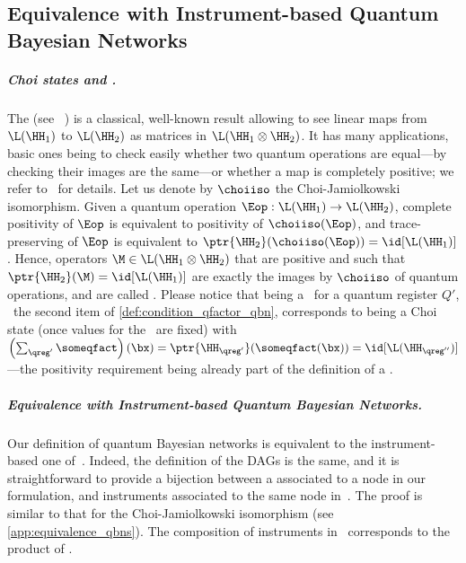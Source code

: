 \subsection{Equivalence with Instrument-based Quantum Bayesian Networks}
\label{sec:choi_iso}

\subparagraph{Choi states and \qCPTs.}

The  (see \eg~\cite{Watrous_book}) is a classical, well-known result allowing to see linear maps from $\L(\HH_1)$ to $\L(\HH_2)$ as matrices in $\L(\HH_1 \otimes \HH_2)$.
It has many applications, basic ones being to check easily whether two quantum operations are equal---by checking their images are the same---or whether a map is completely positive; we refer to~\cite{Watrous_book} for details.
Let us denote by $\choiiso$ the Choi-Jamiolkowski isomorphism.
Given a quantum operation $\Eop : \L(\HH_1) \to \L(\HH_2)$, complete positivity of $\Eop$ is equivalent to positivity of $\choiiso(\Eop)$, and trace-preserving of $\Eop$ is equivalent to $\ptr{\HH_2}(\choiiso(\Eop)) = \id[\L(\HH_1)]$.
Hence, operators $\M\in\L(\HH_1 \otimes \HH_2)$ that are positive and such that $\ptr{\HH_2}(\M) = \id[\L(\HH_1)]$ are exactly the images by $\choiiso$ of quantum operations, and are called .
Please notice that being a \qCPT\ for a quantum register $Q'$, \ie\ the second item of \cref{def:condition_qfactor_qbn}, corresponds to being a Choi state (once values for the \rvs\ are fixed) with $\left(\sum_{\qreg'} \someqfact\right)(\bx) = \ptr{\HH_{\qreg'}}(\someqfact(\bx)) = \id[\L(\HH_{\qreg''})]$---the positivity requirement being already part of the definition of a \Qfactor.

\subparagraph{Equivalence with Instrument-based Quantum Bayesian Networks.}

Our definition of %
quantum Bayesian networks is equivalent to the instrument-based one of~\cite{GBN2014}.
Indeed, the definition of the DAGs is the same, and it is straightforward to provide a bijection between a \qCPT associated to a node in our formulation, and instruments associated to the same node in~\cite{GBN2014}.
The proof is similar to that for the Choi-Jamiolkowski isomorphism (see \cref{app:equivalence_qbns}).
The composition of instruments in~\cite{GBN2014} corresponds to the product of \qCPTs.
